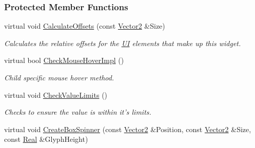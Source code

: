 \subsubsection*{Protected Member Functions}
\begin{DoxyCompactItemize}
\item 
\hypertarget{classMezzanine_1_1UI_1_1Spinner_ad88dda0443e198711e49ae62ca9818e0}{
virtual void \hyperlink{classMezzanine_1_1UI_1_1Spinner_ad88dda0443e198711e49ae62ca9818e0}{CalculateOffsets} (const \hyperlink{classMezzanine_1_1Vector2}{Vector2} \&Size)}
\label{classMezzanine_1_1UI_1_1Spinner_ad88dda0443e198711e49ae62ca9818e0}

\begin{DoxyCompactList}\small\item\em Calculates the relative offsets for the \hyperlink{namespaceMezzanine_1_1UI}{UI} elements that make up this widget. \item\end{DoxyCompactList}\item 
\hypertarget{classMezzanine_1_1UI_1_1Spinner_a09b168d35103255ac0575d0afcbb751a}{
virtual bool \hyperlink{classMezzanine_1_1UI_1_1Spinner_a09b168d35103255ac0575d0afcbb751a}{CheckMouseHoverImpl} ()}
\label{classMezzanine_1_1UI_1_1Spinner_a09b168d35103255ac0575d0afcbb751a}

\begin{DoxyCompactList}\small\item\em Child specific mouse hover method. \item\end{DoxyCompactList}\item 
\hypertarget{classMezzanine_1_1UI_1_1Spinner_ab5195904e7b12bab04cda5db08ed479b}{
virtual void \hyperlink{classMezzanine_1_1UI_1_1Spinner_ab5195904e7b12bab04cda5db08ed479b}{CheckValueLimits} ()}
\label{classMezzanine_1_1UI_1_1Spinner_ab5195904e7b12bab04cda5db08ed479b}

\begin{DoxyCompactList}\small\item\em Checks to ensure the value is within it's limits. \item\end{DoxyCompactList}\item 
\hypertarget{classMezzanine_1_1UI_1_1Spinner_a49f4dc2a2bb4bc8f0052b651cd72d205}{
virtual void \hyperlink{classMezzanine_1_1UI_1_1Spinner_a49f4dc2a2bb4bc8f0052b651cd72d205}{CreateBoxSpinner} (const \hyperlink{classMezzanine_1_1Vector2}{Vector2} \&Position, const \hyperlink{classMezzanine_1_1Vector2}{Vector2} \&Size, const \hyperlink{namespaceMezzanine_a726731b1a7df72bf3583e4a97282c6f6}{Real} \&GlyphHeight)}
\label{classMezzanine_1_1UI_1_1Spinner_a49f4dc2a2bb4bc8f0052b651cd72d205}


\end{DoxyCompactItemize}
